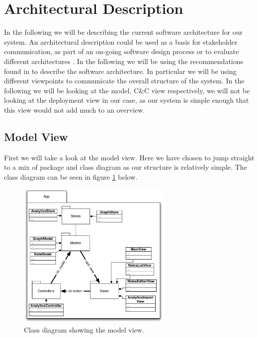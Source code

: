 \section{Architectural Description} %
\label{sec:Architectural Description}

In the following we will be describing the current software architecture for our system. An architectural description could be used as a basis for stakeholder communication, as part of an on-going software design process or to evaluate different architectures \cite{christensen}. In the following we will be using the recommendations found in \cite{christensen} to describe the software architecture. In particular we will be using different viewpoints to communicate the overall structure of the system. In the following we will be looking at the model, C\&C view respectively, we will not be looking at the deployment view in our case, as our system is simple enough that this view would not add much to an overview.

\subsection{Model View}

First we will take a look at the model view. Here we have chosen to jump straight to a mix of package and class diagram as our structure is relatively simple. The class diagram can be seen in figure \ref{mv} below.

\begin{figure}[h!]
  \centering
    \includegraphics[width=0.66\textwidth]{images/model_view.pdf}
  \caption{Class diagram showing the model view.}
  \label{mv}
\end{figure}

